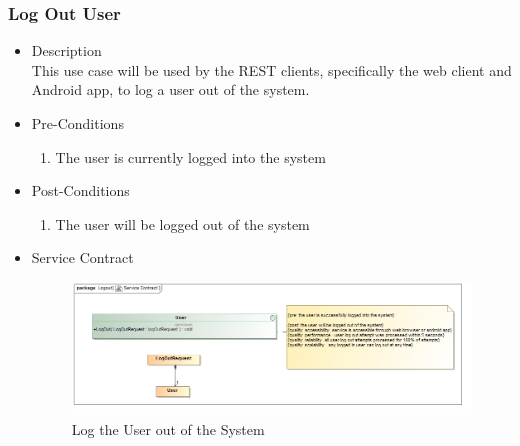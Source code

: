 \documentclass[a4paper,10pt]{article}
\begin{document}
\subsubsection{Log Out User}
	\begin{itemize}
		\item Description\\
			This use case will be used by the REST clients, specifically the web client and Android app, to log a user out of the system.
		\item Pre-Conditions
			\begin{enumerate}
				\item The user is currently logged into the system
			\end{enumerate}
		\item Post-Conditions
			\begin{enumerate}
				\item The user will be logged out of the system
						
			\end{enumerate}
		\item Service Contract
			\begin{figure}[H]
				\includegraphics[scale=0.5]{Log_Out}
				\caption{Log the User out of the System}
			\end{figure}
	\end{itemize}
\end{document}
